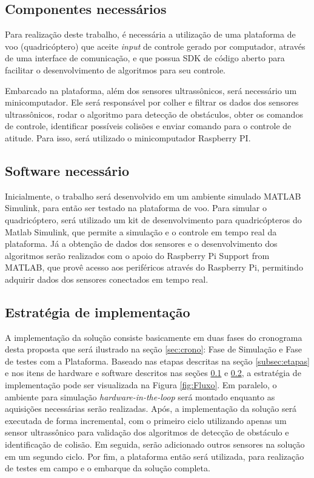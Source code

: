 \documentclass[a4paper, 12pt]{article}
\begin{document}
\subsection{Componentes necessários}

\label{subsec:hardware}

Para realização deste trabalho, é necessária a utilização de uma plataforma de voo (quadricóptero) que aceite \textit{input} de controle gerado por computador, através de uma interface de comunicação, e que possua SDK de código aberto para facilitar o desenvolvimento de algoritmos para seu controle.

Embarcado na plataforma, além dos sensores ultrassônicos, será necessário um minicomputador. Ele será responsável por colher e filtrar os dados dos sensores ultrassônicos, rodar o algoritmo para detecção de obstáculos, obter os comandos de controle, identificar possíveis colisões e enviar comando para o controle de atitude. Para isso, será utilizado o minicomputador Raspberry PI. 

\subsection{Software necessário}

\label{subsec:software}

Inicialmente, o trabalho será desenvolvido em um ambiente simulado MATLAB Simulink, para então ser testado na plataforma de voo. Para simular o quadricóptero, será utilizado um kit de desenvolvimento para quadricópteros do Matlab Simulink, que permite a simulação e o controle em tempo real da plataforma. Já a obtenção de dados dos sensores e o desenvolvimento dos algoritmos serão realizados com o apoio do Raspberry Pi Support from MATLAB, que provê acesso aos periféricos através do Raspberry Pi, permitindo adquirir dados dos sensores conectados em tempo real.

\subsection{Estratégia de implementação}

A implementação da solução consiste basicamente em duas fases do cronograma desta proposta que será ilustrado na seção \ref{sec:crono}: Fase de Simulação e Fase de testes com a Plataforma. Baseado nas etapas descritas na seção \ref{subsec:etapas} e nos itens de hardware e software descritos nas seções \ref{subsec:hardware} e \ref{subsec:software}, a estratégia de implementação pode ser visualizada na Figura \ref{fig:Fluxo}. Em paralelo, o ambiente para simulação \textit{hardware-in-the-loop} será montado enquanto as aquisições necessárias serão realizadas. Após, a implementação da solução será executada de forma incremental, com o primeiro ciclo utilizando apenas um sensor ultrassônico para validação dos algoritmos de detecção de obstáculo e identificação de colisão. Em seguida, serão adicionado outros sensores na solução em um segundo ciclo. Por fim, a plataforma então será utilizada, para realização de testes em campo e o embarque da solução completa.
  
\end{document}
